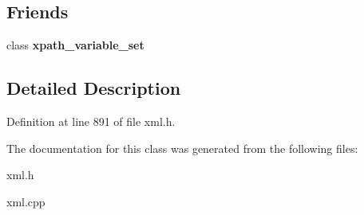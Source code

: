 \subsection*{Friends}
\begin{DoxyCompactItemize}
\item 
\hypertarget{classphys_1_1xml_1_1xpath__variable_ae065e6f4380a8a530c7352703c09ff80}{
class {\bfseries xpath\_\-variable\_\-set}}
\label{d8/d2c/classphys_1_1xml_1_1xpath__variable_ae065e6f4380a8a530c7352703c09ff80}

\end{DoxyCompactItemize}


\subsection{Detailed Description}


Definition at line 891 of file xml.h.



The documentation for this class was generated from the following files:\begin{DoxyCompactItemize}
\item 
xml.h\item 
xml.cpp\end{DoxyCompactItemize}
